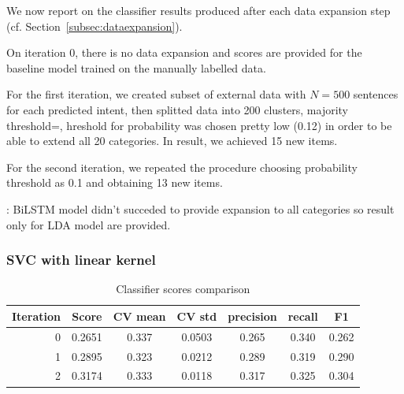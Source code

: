 \documentclass[11pt]{article}
\begin{document}
We now report on the classifier results produced after each data
expansion step (cf. Section~\ref{subsec:dataexpansion}).
 
On iteration 0, there is no data expansion and scores are provided for
the baseline model trained on the manually labelled data.


For the first iteration, we created subset of external data with
$N=500$ sentences for each predicted intent, then splitted data into
200 clusters, majority threshold=, hreshold for probability was chosen
pretty low (0.12) in order to be able to extend all 20 categories. In
result, we achieved 15 new items.

For the second iteration, we repeated the procedure choosing
probability threshold as 0.1 and obtaining 13 new items.

: BiLSTM model didn't succeded to provide expansion to all categories so result only for LDA model are provided.


  
\subsubsection{SVC with linear kernel}


\begin{table}[htb]
\begin{center}
\begin{tabular}{ |r|c|c|c|c|c|c| }
\hline
Iteration 	& Score  & CV mean & CV std & precision & recall & F1 \\ \hline
0			& 0.2651 & 0.337   & 0.0503 & 0.265 	& 0.340  & 0.262 \\ \hline
1			& 0.2895 & 0.323   & 0.0212 & 0.289 	& 0.319  & 0.290 \\ \hline
2 			& 0.3174 & 0.333   & 0.0118 & 0.317 	& 0.325  & 0.304 \\ \hline
\end{tabular}
\caption{Classifier scores comparison}
\label{lin_gen_scores}
\end{center}
\end{table}
\FloatBarrier
\end{document}
